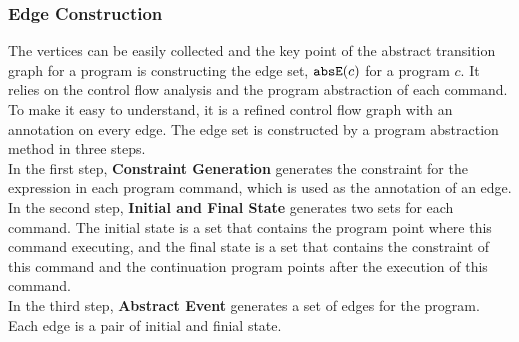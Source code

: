 \subsubsection{Edge Construction}
\label{sec:abscfg-edge}
  The vertices can be easily collected and the key point of the abstract
  transition graph for a program is constructing the edge set, $\mathtt{abs}{\mathtt{E}}(c)$ for a program $c$.
  It relies on the control flow analysis and the program abstraction of each command.
  To make it easy to understand, it
  is a refined control flow graph with an annotation on every edge.
  The edge set is constructed by a program abstraction method in three steps.
  \\
  In the first step, \textbf{Constraint Generation} generates the constraint
  for the expression in each program command,
  which is used as the annotation of an edge.
  \\
  In the second step, \textbf{Initial and Final State} generates two sets for each command. 
  The initial state is a set that contains the
  program point where this command  executing, 
  and the final state is a set
  that contains the constraint of this command
  and the continuation program points after the execution of this command.
  \\ 
  In the third step, \textbf{Abstract Event} generates a set of edges for the program.
  Each edge is a pair of initial and finial state.
%
